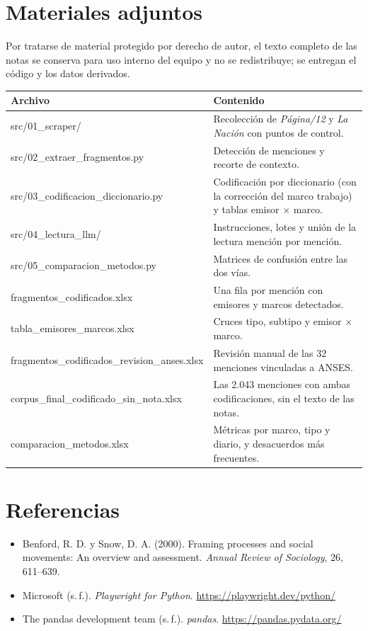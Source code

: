 \documentclass[11pt,a4paper]{article}
\newcommand{\pdoce}{\textit{Página/12}}
\newcommand{\lanac}{\textit{La Nación}}
\begin{document}
\section*{Materiales adjuntos}

Por tratarse de material protegido por derecho de autor, el texto completo de las notas se conserva para uso interno del equipo y no se redistribuye; se entregan el código y los datos derivados.

\begin{table}[h]
\centering\small
\footnotesize\begin{tabularx}{\linewidth}{>{\ttfamily\raggedright}p{7.4cm} X}
\toprule
\normalfont\textbf{Archivo} & \textbf{Contenido} \\
\midrule
src/01\_scraper/ & Recolección de \pdoce{} y \lanac{} con puntos de control. \\
src/02\_extraer\_fragmentos.py & Detección de menciones y recorte de contexto. \\
src/03\_codificacion\_diccionario.py & Codificación por diccionario (con la corrección del marco trabajo) y tablas emisor $\times$ marco. \\
src/04\_lectura\_llm/ & Instrucciones, lotes y unión de la lectura mención por mención. \\
src/05\_comparacion\_metodos.py & Matrices de confusión entre las dos vías. \\
fragmentos\_codificados.xlsx & Una fila por mención con emisores y marcos detectados. \\
tabla\_emisores\_marcos.xlsx & Cruces tipo, subtipo y emisor $\times$ marco. \\
fragmentos\_codificados\_revision\_anses.xlsx & Revisión manual de las 32 menciones vinculadas a ANSES. \\
corpus\_final\_codificado\_sin\_nota.xlsx & Las 2.043 menciones con ambas codificaciones, sin el texto de las notas. \\
comparacion\_metodos.xlsx & Métricas por marco, tipo y diario, y desacuerdos más frecuentes. \\
\bottomrule
\end{tabularx}
\end{table}

\section*{Referencias}
\begin{itemize}[leftmargin=1.2em, label={}]
  \item \label{benford2000}Benford, R. D. y Snow, D. A. (2000). Framing processes and social movements: An overview and assessment. \textit{Annual Review of Sociology}, 26, 611--639.
  \item Microsoft (s.\,f.). \textit{Playwright for Python}. \url{https://playwright.dev/python/}
  \item The pandas development team (s.\,f.). \textit{pandas}. \url{https://pandas.pydata.org/}
\end{itemize}
\end{document}
